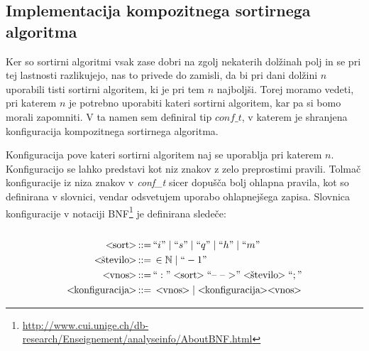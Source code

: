 \documentclass[a4paper,oneside,10pt]{article}
\def\N{\mathbb N}
\def\ali{\;|\;}
\newenvironment{BNF}{
    \\
    \Sbox
    \minipage{12cm}
}{
    \endminipage
    \endSbox
    \minipage{\textwidth}
    \vspace*{5pt}
    \begin{center}
        \fcolorbox{white}{white}{
            \TheSbox
        }
    \end{center}
    \vspace*{5pt}
    \endminipage
}
\def\bnfassign:{\,::=&\,}
\newcommand{\q}[1]{\text{``}#1\text{''}}
\newcommand{\ntm}[1]{\ensuremath{<\!\!\text{#1}\!\!>}}
\newcommand{\abnf}[2]{\ensuremath{\ntm{#1} \bnfassign: #2}}
\begin{document}
\subsection{Implementacija kompozitnega sortirnega algoritma}
\label{chapter:tweaksort}
Ker so sortirni algoritmi vsak zase dobri na zgolj nekaterih dolžinah polj in se pri tej
lastnosti razlikujejo, nas to privede do zamisli, da bi pri dani dolžini $n$ uporabili tisti
sortirni algoritem, ki je pri tem $n$ najboljši. Torej moramo vedeti, pri katerem $n$ je
potrebno uporabiti kateri sortirni algoritem, kar pa si bomo morali zapomniti. V ta
namen sem definiral tip $conf\_t$, v katerem je shranjena konfiguracija kompozitnega
sortirnega algoritma. 

Konfiguracija pove kateri sortirni algoritem naj se uporablja pri
katerem $n$. Konfiguracijo se lahko predstavi kot niz znakov z zelo preprostimi
pravili. Tolmač konfiguracije iz niza znakov v \emph{conf\_t} sicer dopušča bolj ohlapna pravila, kot so
definirana v slovnici, vendar odsvetujem uporabo ohlapnejšega zapisa.
Slovnica konfiguracije v notaciji
BNF\footnote{\url{http://www.cui.unige.ch/db-research/Enseignement/analyseinfo/AboutBNF.html}} 
je definirana sledeče: %
\\
\begin{BNF} %
  \begin{align*}
    \abnf{sort}{\q{i} \ali \q{s} \ali \q{q} \ali \q{h} \ali \q{m}}\\
    \abnf{število}{\in \N \ali \q{-1}} \\
    \abnf{vnos}{\q{:}\ntm{sort}\q{\mbox{--}\ \mbox{--}\ \mbox{$>$}}\ntm{število}\q{;}}\\
    \abnf{konfiguracija}{\ntm{vnos} | \ntm{konfiguracija}\ntm{vnos}}
  \end{align*}
\end{BNF}
\end{document}
